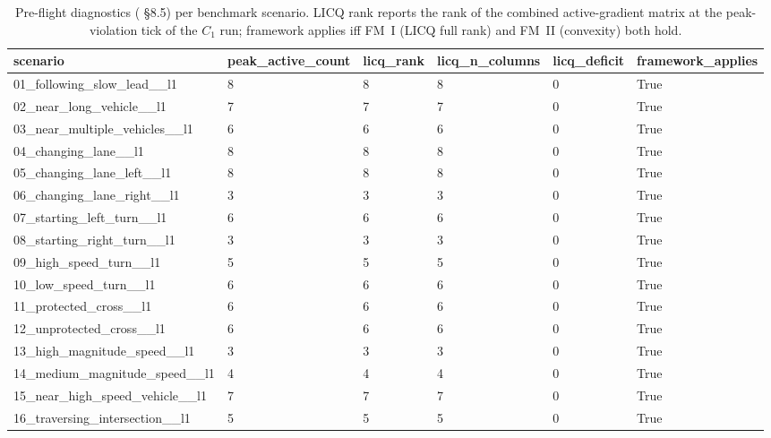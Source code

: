\begin{table}[t]
    \centering
    \caption{Pre-flight diagnostics (\cite{lcp2025} \S8.5) per benchmark scenario. LICQ rank reports the rank of the combined active-gradient matrix at the peak-violation tick of the $C_1$ run; framework applies iff FM~I (LICQ full rank) and FM~II (convexity) both hold.}
    \label{tab:diagnostics}
    \footnotesize
\begin{tabular}{llllll}
\toprule
scenario & peak\_active\_count & licq\_rank & licq\_n\_columns & licq\_deficit & framework\_applies \\
\midrule
01\_following\_slow\_lead\_\_l1 & 8 & 8 & 8 & 0 & True \\
02\_near\_long\_vehicle\_\_l1 & 7 & 7 & 7 & 0 & True \\
03\_near\_multiple\_vehicles\_\_l1 & 6 & 6 & 6 & 0 & True \\
04\_changing\_lane\_\_l1 & 8 & 8 & 8 & 0 & True \\
05\_changing\_lane\_left\_\_l1 & 8 & 8 & 8 & 0 & True \\
06\_changing\_lane\_right\_\_l1 & 3 & 3 & 3 & 0 & True \\
07\_starting\_left\_turn\_\_l1 & 6 & 6 & 6 & 0 & True \\
08\_starting\_right\_turn\_\_l1 & 3 & 3 & 3 & 0 & True \\
09\_high\_speed\_turn\_\_l1 & 5 & 5 & 5 & 0 & True \\
10\_low\_speed\_turn\_\_l1 & 6 & 6 & 6 & 0 & True \\
11\_protected\_cross\_\_l1 & 6 & 6 & 6 & 0 & True \\
12\_unprotected\_cross\_\_l1 & 6 & 6 & 6 & 0 & True \\
13\_high\_magnitude\_speed\_\_l1 & 3 & 3 & 3 & 0 & True \\
14\_medium\_magnitude\_speed\_\_l1 & 4 & 4 & 4 & 0 & True \\
15\_near\_high\_speed\_vehicle\_\_l1 & 7 & 7 & 7 & 0 & True \\
16\_traversing\_intersection\_\_l1 & 5 & 5 & 5 & 0 & True \\
\bottomrule
\end{tabular}
\end{table}
